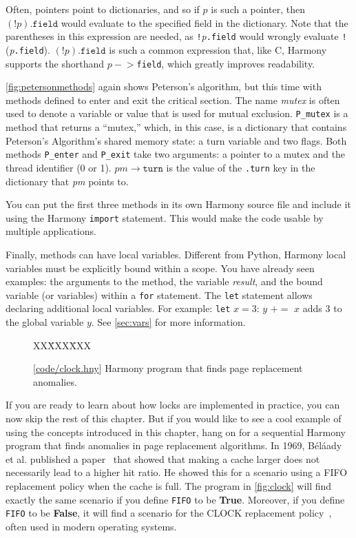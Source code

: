 \documentclass{report}
\newcommand{\harmonysource}[1]{
\begin{tabbing}
XX\=XXX\=XXX\kill
    
\end{tabbing}
}
\newcommand{\harmonylink}[1]{%
[\href{https://harmony.cs.cornell.edu/#1}{\underline{#1}}]%
}
\newenvironment{code}{
\tcolorbox
}{
\endtcolorbox
}
\begin{document}
Often, pointers point to dictionaries, and so if $p$ is such a pointer,
then $(!p).\mathtt{field}$ would evaluate to the specified field in the dictionary.
Note that the parentheses in this expression
are needed, as \texttt{!}\textit{p}\texttt{.field} would wrongly evaluate
\texttt{!}(\textit{p}\texttt{.field}).
$(!p).\mathtt{field}$ is such a common expression that, like C, Harmony supports the
shorthand $p-$$>$\texttt{field}, which greatly improves readability.

\autoref{fig:petersonmethods} again shows Peterson's algorithm,
but this time with methods defined to enter and exit the critical
section.
The name \textit{mutex} is often used to denote a variable or value
that is used for mutual exclusion.
\texttt{P\_mutex} is a method that returns a ``mutex,'' which, in this
case, is a dictionary that contains Peterson's Algorithm's shared memory state:
a turn variable and two flags.
Both methods \texttt{P\_enter} and \texttt{P\_exit} take two arguments:
a pointer to a mutex and the thread identifier (0 or 1).
$\mathit{pm}$$\rightarrow$$\mathtt{turn}$ is the value of the \texttt{.turn} key
in the dictionary that \textit{pm} points to. 

You can put the first three methods in its own Harmony source file
and include it using the Harmony \texttt{import} statement.
%
%
This would make the code usable by multiple applications.

Finally, methods can have local variables.
Different from Python, Harmony local variables must be
explicitly bound within a scope.
You have already seen examples: the arguments to the method,
the variable \textit{result}, and the bound variable (or
variables) within a \texttt{for} statement.
The \texttt{let} statement allows declaring additional
local variables.  For example:
\texttt{let} $x = 3$: $y$ $+$$=$ $x$ adds 3 to the global variable
$y$.
See \autoref{sec:vars} for more information.

\begin{figure}
\begin{code}
\harmonysource{clock}
\end{code}
\caption{\harmonylink{code/clock.hny} Harmony program that finds page replacement anomalies.}
\label{fig:clock}
\end{figure}

If you are ready to learn about how locks are implemented in practice,
you can now skip the rest of this chapter.  But if you would like to
see a cool example of using the concepts introduced in this chapter,
hang on for a sequential Harmony program that finds anomalies in page
replacement algorithms.
In 1969, B\'{e}l\'{a}ady et al. published a paper~\cite{Belady69}
that showed that making a
cache larger does not necessarily lead to a higher hit ratio.  He showed
this for a scenario using a FIFO replacement policy when the cache is full. 
The program in \autoref{fig:clock} will find exactly the same scenario
if you define \texttt{FIFO} to be \textbf{True}.  Moreover, if you define
\texttt{FIFO} to be \textbf{False}, it will find a scenario for the
CLOCK replacement policy~\cite{clock}, often used in modern operating systems.
\end{document}
